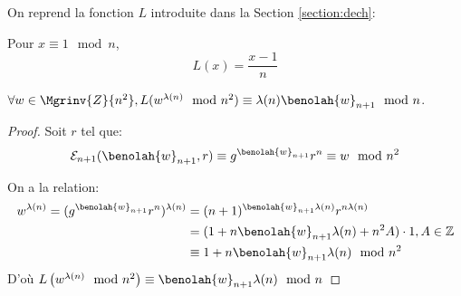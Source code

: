 	On reprend la fonction $L$ introduite dans la Section \ref{section:dech}:
	\begin{rappel}
		Pour $x\equiv 1\mod{n}$,
		$$L(x) =  \frac{x-1}{n}$$
	\end{rappel}

	\begin{lemma}
		$\forall w \in \Mgrinv{Z}{n^2}, L(w^{\lambda(n)}\mod{n^2}) \equiv \lambda(n)\benolah{w}_{n+1}\mod{n}$.
		\begin{proof}
		Soit $r$ tel que:
			\begin{equation}
					\mathcal{E}_{n+1}(\benolah{w  }_{n+1},r) \equiv {g  }^{\benolah{w  }_{n+1}}r^n \equiv w  \mod{n^2}
			\end{equation}

			On a la relation:
			\begin{align*}
				w^{\lambda(n)}  =  ({g  }^{\benolah{w  }_{n+1}}r^n )^{\lambda(n)} &= (n+1)^{\benolah{w  }_{n+1}\lambda(n)} r^{n\lambda(n)} \\
						 					      &= (1+n\benolah{w}_{n+1}\lambda(n) + n^2A)\cdot 1, A\in\mathbb{Z}\\
											      &\equiv 1+n\benolah{w}_{n+1}\lambda(n)\mod{n^2}
			\end{align*}
			D'où $L\left(w^{\lambda(n)} \mod{n^2}\right) \equiv \benolah{w}_{n+1}\lambda(n)\mod{n} $
		\end{proof}
	\end{lemma}

